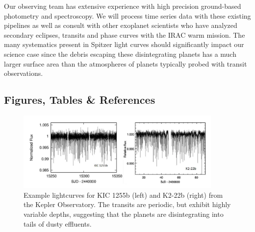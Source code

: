 \documentclass[letterpaper,12pt]{article}
\begin{document}
%
%
%
Our observing team has extensive experience with high precision ground-based photometry and spectroscopy. 
We will process time series data with these existing pipelines as well as consult with other exoplanet scientists who have analyzed secondary eclipses, transits and phase curves with the IRAC warm mission.
The many systematics present in Spitzer light curves should significantly impact our science case since the debris escaping these disintegrating planets has a much larger surface area than the atmospheres of planets typically probed with transit observations.
%

\clearpage
\subsection{Figures, Tables \& References}

\begin{figure}
\centering
\includegraphics[width=0.9\textwidth]{kepler_lightc_variable.png}
\caption{Example lightcurves for KIC 1255b (left) and K2-22b (right) from the Kepler Observatory. The transits are periodic, but exhibit highly variable depths, suggesting that the planets are disintegrating into tails of dusty effluents.}\label{fig:exKeplerCurves}
\end{figure}
\end{document}
